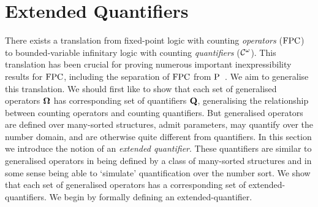\documentclass[../main/thesis.tex]{subfiles}
\begin{document}


\section{Extended Quantifiers}
\label{chpt:gen-op--sec:extended-quantifiers}
There exists a translation from fixed-point logic with counting \emph{operators}
($\text{\upshape FPC}$) to bounded-variable infinitary logic with counting \emph{quantifiers}
($\mathcal{C}^\omega$). This translation has been crucial for proving numerous important
inexpressibility results for $\text{\upshape FPC}$, including the separation of $\text{\upshape FPC}$ from
$\mathrm{P}$~\cite{}. We aim to generalise this translation. We should first like to
show that each set of generalised operators $\mathbf{\mathbf{\Omega}}$ has corresponding set of
quantifiers $\mathbf{Q}$, generalising the relationship between counting
operators and counting quantifiers. But generalised operators are defined over
many-sorted structures, admit parameters, may quantify over the number domain,
and are otherwise quite different from {\lindstrom} quantifiers. In this section
we introduce the notion of an \emph{extended quantifier}. These quantifiers are
similar to generalised operators in being defined by a class of many-sorted
structures and in some sense being able to `simulate' quantification over the
number sort. We show that each set of generalised operators has a corresponding
set of extended-quantifiers. We begin by formally defining an
extended-quantifier.






\end{document}
